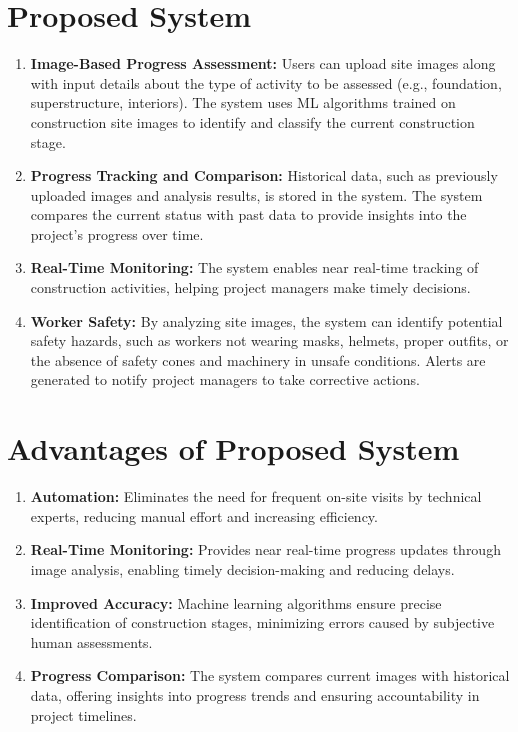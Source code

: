 \documentclass[12pt,a4paper]{report}
\begin{document}
\section{Proposed System}
\begin{enumerate}
    \item \textbf{Image-Based Progress Assessment:} Users can upload site images along with input details about the type of activity to be assessed (e.g., foundation, superstructure, interiors). The system uses ML algorithms trained on construction site images to identify and classify the current construction stage.
    \item \textbf{Progress Tracking and Comparison:} Historical data, such as previously uploaded images and analysis results, is stored in the system. The system compares the current status with past data to provide insights into the project's progress over time.
    \item \textbf{Real-Time Monitoring:} The system enables near real-time tracking of construction activities, helping project managers make timely decisions.
    \item \textbf{Worker Safety:} By analyzing site images, the system can identify potential safety hazards, such as workers not wearing masks, helmets, proper outfits, or the absence of safety cones and machinery in unsafe conditions. Alerts are generated to notify project managers to take corrective actions.
\end{enumerate}

\section{Advantages of Proposed System}
\begin{enumerate}
    \item \textbf{Automation:} Eliminates the need for frequent on-site visits by technical experts, reducing manual effort and increasing efficiency.
    \item \textbf{Real-Time Monitoring:} Provides near real-time progress updates through image analysis, enabling timely decision-making and reducing delays.
    \item \textbf{Improved Accuracy:} Machine learning algorithms ensure precise identification of construction stages, minimizing errors caused by subjective human assessments.
    \item \textbf{Progress Comparison:} The system compares current images with historical data, offering insights into progress trends and ensuring accountability in project timelines.
\end{enumerate}
\end{document}
